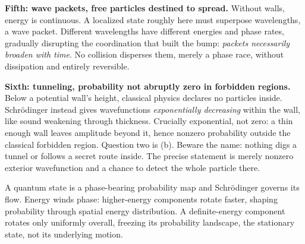 \begin{mainline}
\textbf{Fifth: wave packets, free particles destined to spread.} Without walls, energy is continuous. A localized state roughly here must superpose wavelengths, a wave packet. Different wavelengths have different energies and phase rates, gradually disrupting the coordination that built the bump: \emph{packets necessarily broaden with time}. No collision disperses them, merely a phase race, without dissipation and entirely reversible.

\textbf{Sixth: tunneling, probability not abruptly zero in forbidden regions.} Below a potential wall's height, classical physics declares no particles inside. Schrödinger instead gives wavefunctions \emph{exponentially decreasing} within the wall, like sound weakening through thickness. Crucially exponential, not zero: a thin enough wall leaves amplitude beyond it, hence nonzero probability outside the classical forbidden region. Question two is (b). Beware the name: nothing digs a tunnel or follows a secret route inside. The precise statement is merely nonzero exterior wavefunction and a chance to detect the whole particle there.
\end{mainline}


\begin{oneline}
A quantum state is a phase-bearing probability map and Schrödinger governs its flow. Energy winds phase: higher-energy components rotate faster, shaping probability through spatial energy distribution. A definite-energy component rotates only uniformly overall, freezing its probability landscape, the stationary state, not its underlying motion.
\end{oneline}


